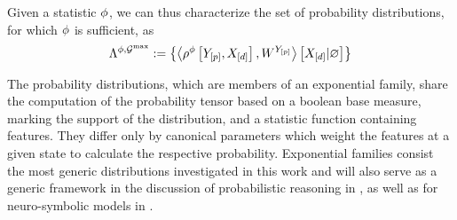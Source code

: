 Given a statistic $\phi$, we can thus characterize the set of probability distributions, for which $\phi$ is sufficient, as
\begin{align*} %
    \realizabledistsof{\sstat,\maxgraph}
    := \left\{\normationof{\rencodingofat{\sstat}{\headvariableof{[\seldim]},\shortcatvariables},\actcoreof{\headvariableof{[\seldim]}}}{\shortcatvariables} \right\}
\end{align*}





The probability distributions, which are members of an exponential family, share the computation of the probability tensor based on a boolean base measure, marking the support of the distribution, and a statistic function containing features.
They differ only by canonical parameters which weight the features at a given state to calculate the respective probability.
Exponential families consist the most generic distributions investigated in this work and will also serve as a generic framework in the discussion of probabilistic reasoning in , as well as for neuro-symbolic models in .



